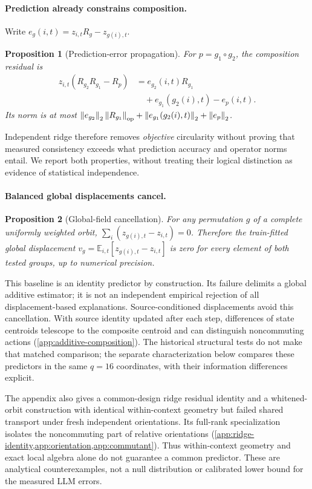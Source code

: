 \documentclass{article}
\newcommand{\norm}[1]{\left\lVert #1\right\rVert}
\newtheorem{proposition}{Proposition}
\begin{document}
\paragraph{Prediction already constrains composition.}
Write $e_g(i,t)=z_{i,t}R_g-z_{g(i),t}$.
\begin{proposition}[Prediction-error propagation]
\label{prop:propagation}
For $p=g_1\circ g_2$, the composition residual is
\begin{align}
 z_{i,t}(R_{g_2}R_{g_1}-R_p)
 &=e_{g_2}(i,t)R_{g_1} \nonumber\\
 &\quad+e_{g_1}(g_2(i),t)-e_p(i,t).
\end{align}
Its norm is at most $\norm{e_{g_2}}_2\norm{R_{g_1}}_{\rm op}+\norm{e_{g_1}(g_2(i),t)}_2+\norm{e_p}_2$.
\end{proposition}
Independent ridge therefore removes \emph{objective} circularity without proving that measured consistency exceeds what prediction accuracy and operator norms entail. We report both properties, without treating their logical distinction as evidence of statistical independence.

\paragraph{Balanced global displacements cancel.}
\begin{proposition}[Global-field cancellation]
\label{prop:additive}
For any permutation $g$ of a complete uniformly weighted orbit, $\sum_i(z_{g(i),t}-z_{i,t})=0$. Therefore the train-fitted global displacement $v_g=\mathbb{E}_{i,t}[z_{g(i),t}-z_{i,t}]$ is zero for every element of both tested groups, up to numerical precision.
\end{proposition}
This baseline is an identity predictor by construction. Its failure delimits a global additive estimator; it is not an independent empirical rejection of all displacement-based explanations. Source-conditioned displacements avoid this cancellation. With source identity updated after each step, differences of state centroids telescope to the composite centroid and can distinguish noncommuting actions (\cref{app:additive-composition}). The historical structural tests do not make that matched comparison; the separate characterization below compares these predictors in the same $q=16$ coordinates, with their information differences explicit.

The appendix also gives a common-design ridge residual identity and a whitened-orbit construction with identical within-context geometry but failed shared transport under fresh independent orientations. Its full-rank specialization isolates the noncommuting part of relative orientations (\cref{app:ridge-identity,app:orientation,app:commutant}). Thus within-context geometry and exact local algebra alone do not guarantee a common predictor. These are analytical counterexamples, not a null distribution or calibrated lower bound for the measured LLM errors.
\end{document}
